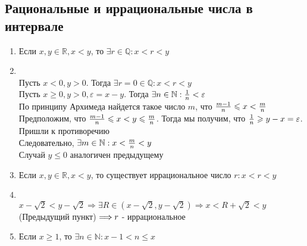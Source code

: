\documentclass[12pt,letterpaper]{report}
\makeatletter
\renewenvironment{proof}[1][\proofname]{%
   \par\pushQED{\qed}\normalfont%
   \topsep6\p@\@plus6\p@\relax
   \trivlist\item[\hskip\labelsep\bfseries#1\@addpunct{.}]%
   \ignorespaces
}{%
   \popQED\endtrivlist\@endpefalse
}
\makeatother
\begin{document}
\subsection{Рациональные и иррациональные числа в интервале}
\begin{enumerate}
    \item Если $x, y \in \mathbb{R}, x < y$, то $\exists r \in \mathbb{Q}: x < r < y$ 
    \begin{proof}
        \quad \\ Пусть $x < 0, y > 0$. Тогда $\exists r = 0 \in \mathbb{Q}: x < r < y$ \\
        Пусть $x \geqslant 0, y > 0, \varepsilon = x - y$. Тогда $\exists n \in \mathbb{N}: {{1}\over{n}} < \varepsilon$ \\
        По принципу Архимеда найдется такое число $m$, что ${{m-1}\over{n}} \leqslant x < {{m}\over{n}}$ \vspace{0.2cm} \\
        Предположим, что ${{m-1}\over{n}} \leqslant x < y \leqslant {{m}\over{n}}$. Тогда мы получим, что ${{1}\over{n}} \geqslant y - x = \varepsilon$.
        Пришли к противоречию\\
        Следовательно, $\exists m \in \mathbb{N} : x < {{m}\over{n}} < y$ \\
        Случай $y \leqslant 0$ аналогичен предыдущему
    \end{proof} 
    \item Если $x, y \in \mathbb{R}, x < y$, то существует иррациональное число $r: x < r < y$ 
    \begin{proof}
        \quad \\ $x - \sqrt{2} < y - \sqrt{2} \Longrightarrow \exists R \in (x - \sqrt{2}, y - \sqrt{2}) \Longrightarrow
        x < R + \sqrt{2} < y \; $(Предыдущий пункт)$ \; \Longrightarrow \\ r$ - иррациональное
    \end{proof} 
    \item Если $x \geqslant 1$, то $\exists n \in \mathbb{N}: x - 1 < n \leqslant x$ 
\end{enumerate}
\end{document}
